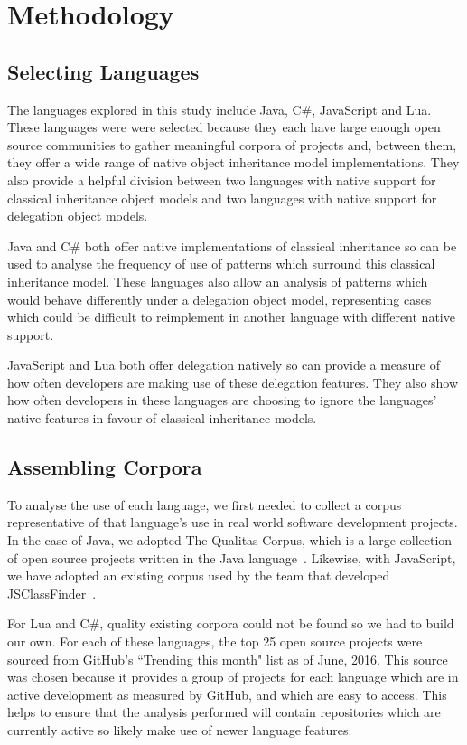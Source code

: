 \chapter{Methodology}\label{C:method} 

\section{Selecting Languages}
The languages explored in this study include Java, C\#, JavaScript and Lua. These languages were were selected because they each have large enough open source communities to gather meaningful corpora of projects and, between them, they offer a wide range of native object inheritance model implementations. They also provide a helpful division between two languages with native support for classical inheritance object models and two languages with native support for delegation object models.
\newline

Java and C\# both offer native implementations of classical inheritance so can be used to analyse the frequency of use of patterns which surround this classical inheritance model. These languages also allow an analysis of patterns which would behave differently under a delegation object model, representing cases which could be difficult to reimplement in another language with different native support.
\newline

JavaScript and Lua both offer delegation natively so can provide a measure of how often developers are making use of these delegation features. They also show how often developers in these languages are choosing to ignore the languages' native features in favour of classical inheritance models.

\section{Assembling Corpora}
To analyse the use of each language, we first needed to collect a corpus representative of that language's use in real world software development projects. In the case of Java, we adopted The Qualitas Corpus, which is a large collection of open source projects written in the Java language~\cite{QualitasCorpus}. Likewise, with JavaScript, we have adopted an existing corpus used by the team that developed JSClassFinder~\cite{JSClassFinder}.
\newline

For Lua and C\#, quality existing corpora could not be found so we had to build our own. For each of these languages, the top 25 open source projects were sourced from GitHub's ``Trending this month" list as of June, 2016. This source was chosen because it provides a group of projects for each language which are in active development as measured by GitHub, and which are easy to access. This helps to ensure that the analysis performed will contain repositories which are currently active so likely make use of newer language features.

